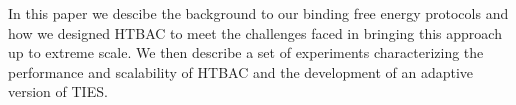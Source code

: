 

In this paper we descibe the background to our binding free energy protocols
and how we designed HTBAC to meet the challenges faced in bringing this
approach up to extreme scale. We then describe a set of experiments
characterizing the performance and scalability of HTBAC and the development of
an adaptive version of TIES. 

